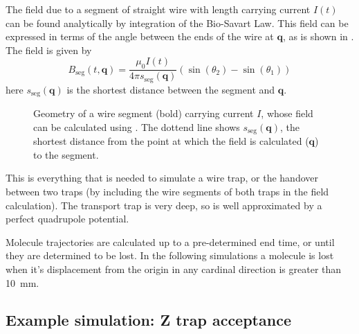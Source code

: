 The field due to a segment of straight wire with length carrying current $I(t)$
can be found analytically by integration of the Bio-Savart Law.
This field can be expressed in terms of the angle between the ends of the wire
at $\mathbf{q}$, as is shown in . The field
is given by~\cite{Griffiths2017}
%
\begin{equation}
  B_\text{seg}(t, \mathbf{q}) = \frac{\mu_0 I(t)}{4\pi
  s_\text{seg}(\mathbf{q})} (\sin(\theta_2)  - \sin(\theta_1))
\label{design:eq:segmentfield}
\end{equation}
here $s_\text{seg}(\mathbf{q})$ is the shortest distance between the segment
and $\mathbf{q}$.

\begin{figure}[h]
\centering
  \caption{Geometry of a wire segment (bold) carrying current $I$, whose field
  can be calculated using . The dottend line
  shows $s_\text{seg}(\mathbf{q})$, the shortest distance from the point at
  which the field is calculated ($\mathbf{q}$) to the segment.
  }
  \label{design:fig:wiresegment}
\end{figure}

This is everything that is needed to simulate a wire trap, or the handover
between two traps (by including the wire segments of both traps in the field
calculation). The transport trap is very deep, so is well approximated by a
perfect quadrupole potential.

Molecule trajectories are calculated up to a pre-determined end time, or until
they are determined to be lost. In the following simulations a molecule is lost
when it's displacement from the origin in any cardinal direction is greater
than \SI{10}{\milli\meter}.

\subsection{Example simulation: Z trap acceptance}

